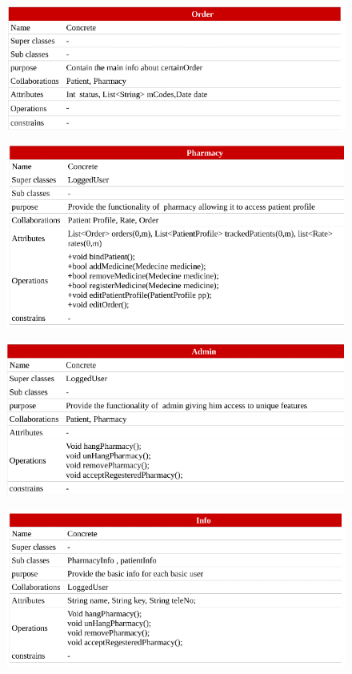 \documentclass[]{article}
\begin{document}
\begin{figure}[H]
\centering
\includegraphics[scale=0.4]{./classdiagram/description/09}
\end{figure}

\begin{figure}[H]
\centering
\includegraphics[scale=0.4]{./classdiagram/description/10}
\end{figure}

\begin{figure}[H]
\centering
\includegraphics[scale=0.4]{./classdiagram/description/11}
\end{figure}

\begin{figure}[H]
\centering
\includegraphics[scale=0.4]{./classdiagram/description/12}
\end{figure}
\end{document}
